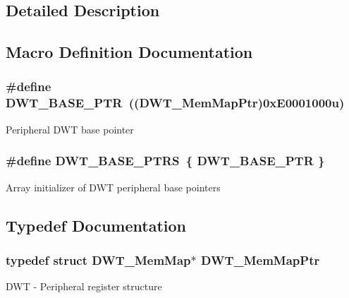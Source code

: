 \subsection{Detailed Description}


\subsection{Macro Definition Documentation}
\hypertarget{group___d_w_t___peripheral_ga3b46dfb2ea7946c6938028d879c82cb1}{}
\subsubsection[{D\+W\+T\+\_\+\+B\+A\+S\+E\+\_\+\+P\+T\+R}]{\setlength{\rightskip}{0pt plus 5cm}\#define D\+W\+T\+\_\+\+B\+A\+S\+E\+\_\+\+P\+T\+R~(({\bf D\+W\+T\+\_\+\+Mem\+Map\+Ptr})0x\+E0001000u)}\label{group___d_w_t___peripheral_ga3b46dfb2ea7946c6938028d879c82cb1}
Peripheral D\+W\+T base pointer \hypertarget{group___d_w_t___peripheral_ga606d55285f2df3c4bb43272ec842b475}{}
\subsubsection[{D\+W\+T\+\_\+\+B\+A\+S\+E\+\_\+\+P\+T\+R\+S}]{\setlength{\rightskip}{0pt plus 5cm}\#define D\+W\+T\+\_\+\+B\+A\+S\+E\+\_\+\+P\+T\+R\+S~\{ {\bf D\+W\+T\+\_\+\+B\+A\+S\+E\+\_\+\+P\+T\+R} \}}\label{group___d_w_t___peripheral_ga606d55285f2df3c4bb43272ec842b475}
Array initializer of D\+W\+T peripheral base pointers 

\subsection{Typedef Documentation}
\hypertarget{group___d_w_t___peripheral_ga8a09a1b28d871c18ae8c69f67af6d573}{}
\subsubsection[{D\+W\+T\+\_\+\+Mem\+Map\+Ptr}]{\setlength{\rightskip}{0pt plus 5cm}typedef struct {\bf D\+W\+T\+\_\+\+Mem\+Map}$\ast$ {\bf D\+W\+T\+\_\+\+Mem\+Map\+Ptr}}\label{group___d_w_t___peripheral_ga8a09a1b28d871c18ae8c69f67af6d573}
D\+W\+T -\/ Peripheral register structure 